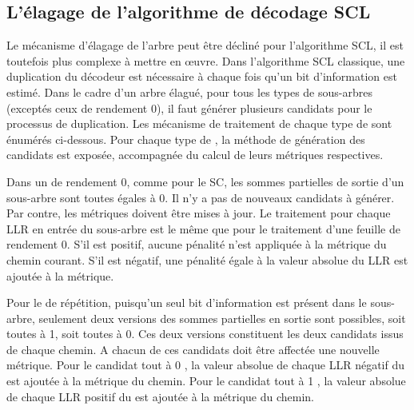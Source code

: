 \subsection{L'élagage de l'algorithme de décodage SCL}
\label{subsec:pruning}

Le mécanisme d'élagage de l'arbre peut être décliné pour l'algorithme SCL, il est toutefois plus complexe à mettre en œuvre. Dans l'algorithme SCL classique, une duplication du décodeur est nécessaire à chaque fois qu'un bit d'information est estimé. Dans le cadre d'un arbre élagué, pour tous les types de sous-arbres (exceptés ceux de rendement 0), il faut générer plusieurs candidats pour le processus de duplication. Les mécanisme de traitement de chaque type de \noeud sont énumérés ci-dessous. Pour chaque type de \noeud, la méthode de génération des candidats est exposée, accompagnée du calcul de leurs métriques respectives.

Dans un \noeud de rendement 0, comme pour le SC, les sommes partielles de sortie d'un sous-arbre sont toutes égales à 0. Il n'y a pas de nouveaux candidats à générer. Par contre, les métriques doivent être mises à jour. Le traitement pour chaque LLR en entrée du sous-arbre est le même que pour le traitement d'une feuille de rendement 0. S'il est positif, aucune pénalité n'est appliquée à la métrique du chemin courant. S'il est négatif, une pénalité égale à la valeur absolue du LLR est ajoutée à la métrique. 

Pour le \noeud de répétition, puisqu'un seul bit d'information est présent dans le sous-arbre, seulement deux versions des sommes partielles en sortie sont possibles, soit toutes à 1, soit toutes à 0. Ces deux versions constituent les deux candidats issus de chaque chemin. A chacun de ces candidats doit être affectée une nouvelle métrique. 
Pour le candidat \og tout à 0 \fg, la valeur absolue de chaque LLR négatif du \noeud est ajoutée à la métrique du chemin. 
Pour le candidat \og tout à 1 \fg, la valeur absolue de chaque LLR positif du \noeud est ajoutée à la métrique du chemin. 

